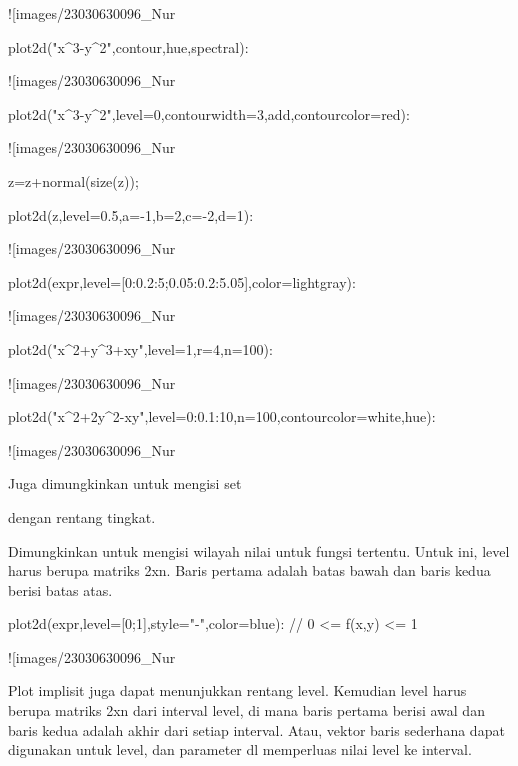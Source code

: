 \documentclass{article}
\begin{document}
![images/23030630096_Nur%

\>plot2d("x^3-y^2",\>contour,\>hue,\>spectral):


![images/23030630096_Nur%

\>plot2d("x^3-y^2",level=0,contourwidth=3,\>add,contourcolor=red):


![images/23030630096_Nur%

\>z=z+normal(size(z));

\>plot2d(z,level=0.5,a=-1,b=2,c=-2,d=1):


![images/23030630096_Nur%

\>plot2d(expr,level=[0:0.2:5;0.05:0.2:5.05],color=lightgray):


![images/23030630096_Nur%

\>plot2d("x^2+y^3+x\*y",level=1,r=4,n=100):


![images/23030630096_Nur%

\>plot2d("x^2+2\*y^2-x\*y",level=0:0.1:10,n=100,contourcolor=white,\>hue):


![images/23030630096_Nur%

Juga dimungkinkan untuk mengisi set


dengan rentang tingkat.


Dimungkinkan untuk mengisi wilayah nilai untuk fungsi tertentu. Untuk
ini, level harus berupa matriks 2xn. Baris pertama adalah batas bawah
dan baris kedua berisi batas atas.


\>plot2d(expr,level=[0;1],style="-",color=blue): // 0 <= f(x,y) <= 1


![images/23030630096_Nur%

Plot implisit juga dapat menunjukkan rentang level. Kemudian level
harus berupa matriks 2xn dari interval level, di mana baris pertama
berisi awal dan baris kedua adalah akhir dari setiap interval. Atau,
vektor baris sederhana dapat digunakan untuk level, dan parameter dl
memperluas nilai level ke interval.
\end{document}
